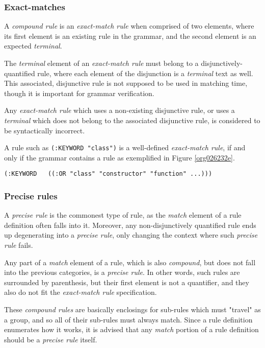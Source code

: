 \documentclass[a4paper,11pt,oneside]{article}
\begin{document}
\subsubsection*{Exact-matches}
\label{sec:orgeccd696}

A \emph{compound rule} is an \emph{exact-match rule} when comprised of two elements,
where its first element is an existing rule in the grammar, and the
second element is an expected \emph{terminal}.

The \emph{terminal} element of an \emph{exact-match rule} must belong to a
disjunctively-quantified rule, where each element of the disjunction
is a \emph{terminal} text as well. This associated, disjunctive rule is not
supposed to be used in matching time, though it is important for
grammar verification.

Any \emph{exact-match rule} which uses a non-existing disjunctive rule, or
uses a \emph{terminal} which does not belong to the associated disjunctive
rule, is considered to be syntactically incorrect.

A rule such as \texttt{(:KEYWORD "class")} is a well-defined \emph{exact-match rule},
if and only if the grammar contains a rule as exemplified in Figure
\ref{org026232e}.

\begin{verbatim}
(:KEYWORD   ((:OR "class" "constructor" "function" ...)))
\end{verbatim}

\subsubsection*{Precise rules}
\label{sec:org9a7a1be}

A \emph{precise rule} is the commonest type of rule, as the \emph{match}
element of a rule definition often falls into it. Moreover, any
non-disjunctively quantified rule ends up degenerating into a \emph{precise
rule}, only changing the context where such \emph{precise rule} fails.

Any part of a \emph{match} element of a rule, which is also \emph{compound}, but
does not fall into the previous categories, is a \emph{precise rule}. In
other words, such rules are surrounded by parenthesis, but their first
element is not a quantifier, and they also do not fit the \emph{exact-match
rule} specification.

These \emph{compound rules} are basically enclosings for sub-rules which must
"travel" as a group, and so all of their sub-rules must always
match. Since a rule definition enumerates how it works, it is advised
that any \emph{match} portion of a rule definition should be a \emph{precise rule}
itself.
\end{document}
